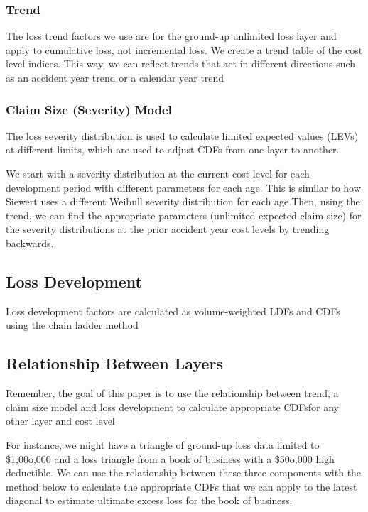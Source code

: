 \documentclass[
]{article}
\begin{document}
\subsubsection{Trend}\label{trend}

The loss trend factors we use are for the ground-up unlimited loss layer
and apply to cumulative loss, not incremental loss. We create a trend
table of the cost level indices. This way, we can reflect trends that
act in different directions such as an accident year trend or a calendar
year trend

\subsubsection{Claim Size (Severity)
Model}\label{claim-size-severity-model}

The loss severity distribution is used to calculate limited expected
values (LEVs) at different limits, which are used to adjust CDFs from
one layer to another.

We start with a severity distribution at the current cost level for each
development period with different parameters for each age. This is
similar to how Siewert uses a different Weibull severity distribution
for each age.Then, using the trend, we can find the appropriate
parameters (unlimited expected claim size) for the severity
distributions at the prior accident year cost levels by trending
backwards.

\subsection{Loss Development}\label{loss-development}

Loss development factors are calculated as volume-weighted LDFs and CDFs
using the chain ladder method

\subsection{Relationship Between
Layers}\label{relationship-between-layers}

Remember, the goal of this paper is to use the relationship between
trend, a claim size model and loss development to calculate appropriate
CDFsfor any other layer and cost level

For instance, we might have a triangle of ground-up loss data limited to
\$1,00o,000 and a loss triangle from a book of business with a \$50o,000
high deductible. We can use the relationship between these three
components with the method below to calculate the appropriate CDFs that
we can apply to the latest diagonal to estimate ultimate excess loss for
the book of business.
\end{document}
